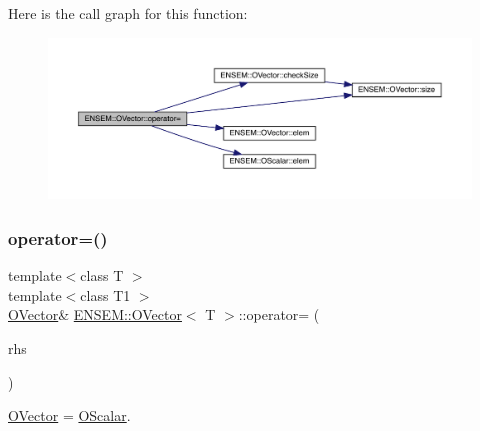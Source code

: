 Here is the call graph for this function\+:
\nopagebreak
\begin{figure}[H]
\begin{center}
\leavevmode
\includegraphics[width=350pt]{d0/d8d/classENSEM_1_1OVector_a31b08dda73879d2a39c4a0bec90bc401_cgraph}
\end{center}
\end{figure}
\mbox{\label{classENSEM_1_1OVector_a31b08dda73879d2a39c4a0bec90bc401}} 
\subsubsection{\texorpdfstring{operator=()}{operator=()}\hspace{0.1cm}{\footnotesize\ttfamily [6/12]}}
{\footnotesize\ttfamily template$<$class T $>$ \\
template$<$class T1 $>$ \\
\mbox{\hyperlink{classENSEM_1_1OVector}{O\+Vector}}\& \mbox{\hyperlink{classENSEM_1_1OVector}{E\+N\+S\+E\+M\+::\+O\+Vector}}$<$ T $>$\+::operator= (\begin{DoxyParamCaption}\item[{const \mbox{\hyperlink{classENSEM_1_1OScalar}{O\+Scalar}}$<$ T1 $>$ \&}]{rhs }\end{DoxyParamCaption})\hspace{0.3cm}{\ttfamily [inline]}}



\mbox{\hyperlink{classENSEM_1_1OVector}{O\+Vector}} = \mbox{\hyperlink{classENSEM_1_1OScalar}{O\+Scalar}}. 

